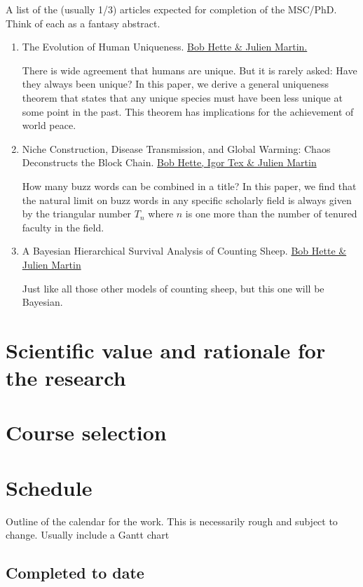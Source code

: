 \documentclass[
  letterpaper,
  DIV=11,
  numbers=noendperiod]{scrartcl}
\begin{document}
A list of the (usually 1/3) articles expected for completion of the
MSC/PhD. Think of each as a fantasy abstract.

\begin{enumerate}
\def\labelenumi{\arabic{enumi}.}
\item
  The Evolution of Human Uniqueness. \ul{Bob Hette \& Julien Martin.}

  There is wide agreement that humans are unique. But it is rarely
  asked: Have they always been unique? In this paper, we derive a
  general uniqueness theorem that states that any unique species must
  have been less unique at some point in the past. This theorem has
  implications for the achievement of world peace.
\item
  Niche Construction, Disease Transmission, and Global Warming: Chaos
  Deconstructs the Block Chain. \ul{Bob Hette, Igor Tex \& Julien
  Martin}

  How many buzz words can be combined in a title? In this paper, we find
  that the natural limit on buzz words in any specific scholarly field
  is always given by the triangular number \(T_n\) where \(n\) is one
  more than the number of tenured faculty in the field.
\item
  A Bayesian Hierarchical Survival Analysis of Counting Sheep. \ul{Bob
  Hette \& Julien Martin}

  Just like all those other models of counting sheep, but this one will
  be Bayesian.
\end{enumerate}

\section{Scientific value and rationale for the
research}\label{scientific-value-and-rationale-for-the-research}

\section{Course selection}\label{course-selection}

\section{Schedule}\label{schedule}

Outline of the calendar for the work. This is necessarily rough and
subject to change. Usually include a Gantt chart

\subsection{Completed to date}\label{completed-to-date}
\end{document}
